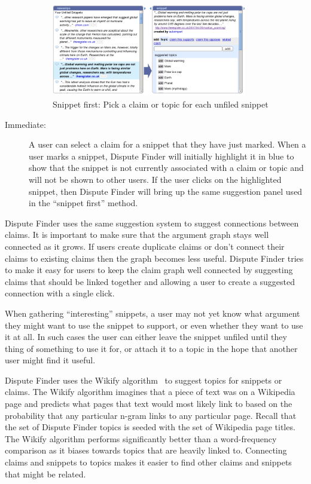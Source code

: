 \documentclass{www2010-submission}
\newcommand{\todo}[1]{}
\begin{document}
\begin{description}
\todo{Updated screenshot with ``enter new claim or search keywords'' present}

\begin{figure}[tb]
	\begin{center}
	\includegraphics[width=8.5cm]{../screenshots/v2_sniptopic.png}
	\caption{Snippet first: Pick a claim or topic for each unfiled snippet}
	\label{sniptopic}
	\end{center}
\end{figure}

\item[Immediate:] A user can select a claim for a snippet that they have just marked. When a user marks a snippet, Dispute Finder will initially highlight it in blue to show that the snippet is not currently associated with a claim or topic and will not be shown to other users. If the user clicks on the highlighted snippet, then Dispute Finder will bring up the same suggestion panel used in the ``snippet first'' method.
\end{description}

Dispute Finder uses the same suggestion system to suggest connections between claims. It is important to make sure that the argument graph stays well connected as it grows. If users create duplicate claims or don't connect their claims to existing claims then the graph becomes less useful. Dispute Finder tries to make it easy for users to keep the claim graph well connected by suggesting claims that should be linked together and allowing a user to create a suggested connection with a single click. 

When gathering ``interesting'' snippets, a user may not yet know what argument they might want to use the snippet to support, or even whether they want to use it at all. In such cases the user can either leave the snippet unfiled until they thing of something to use it for, or attach it to a topic in the hope that another user might find it useful.

Dispute Finder uses the Wikify algorithm~\cite{Mihalcea2007} to suggest topics for snippets or claims. The Wikify algorithm imagines that a piece of text was on a Wikipedia page and predicts what pages that text would most likely link to based on the probability that any particular n-gram links to any particular page. Recall that the set of Dispute Finder topics is seeded with the set of Wikipedia page titles. The Wikify algorithm performs significantly better than a word-frequency comparison as it biases towards topics that are heavily linked to. Connecting claims and snippets to topics makes it easier to find other claims and snippets that might be related.
\end{document}
